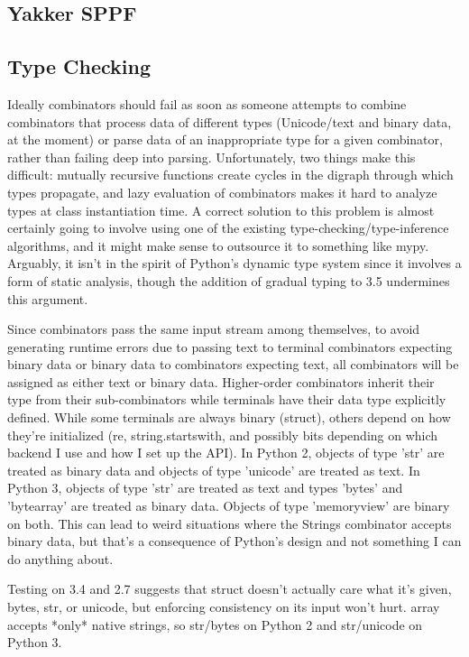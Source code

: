 \documentclass[12pt]{article}
\begin{document}
\subsection{Yakker SPPF}
\label{sec:yakker_sppf}


\subsection{Type Checking}
\label{sec:type_checking}

Ideally combinators should fail as soon as someone attempts to combine
combinators that process data of different types (Unicode/text and
binary data, at the moment) or parse data of an inappropriate type for
a given combinator, rather than failing deep into parsing.
Unfortunately, two things make this difficult: mutually recursive
functions create cycles in the digraph through which types propagate,
and lazy evaluation of combinators makes it hard to analyze types at
class instantiation time.  A correct solution to this problem is
almost certainly going to involve using one of the existing
type-checking/type-inference algorithms, and it might make sense to
outsource it to something like mypy.  Arguably, it isn't in the spirit
of Python's dynamic type system since it involves a form of static
analysis, though the addition of gradual typing to 3.5 undermines this
argument.

Since combinators pass the same input stream among themselves, to
avoid generating runtime errors due to passing text to terminal
combinators expecting binary data or binary data to combinators
expecting text, all combinators will be assigned as either text or
binary data.  Higher-order combinators inherit their type from their
sub-combinators while terminals have their data type explicitly
defined.  While some terminals are always binary (struct), others
depend on how they're initialized (re, string.startswith, and possibly
bits depending on which backend I use and how I set up the API).  In
Python 2, objects of type 'str' are treated as binary data and objects
of type 'unicode' are treated as text.  In Python 3, objects of type
'str' are treated as text and types 'bytes' and 'bytearray' are
treated as binary data.  Objects of type 'memoryview' are binary on
both.  This can lead to weird situations where the Strings combinator
accepts binary data, but that's a consequence of Python's design and
not something I can do anything about.

Testing on 3.4 and 2.7 suggests that struct doesn't actually care what
it's given, bytes, str, or unicode, but enforcing consistency on its
input won't hurt.  array accepts *only* native strings, so str/bytes
on Python 2 and str/unicode on Python 3.
\end{document}
